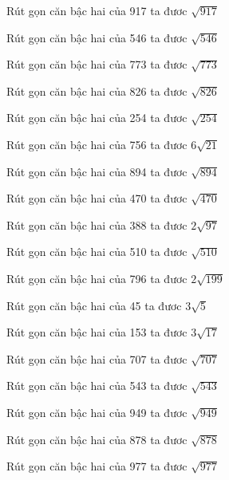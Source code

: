 \documentclass[12pt,a4paper]{article}
\begin{document}
\begin{ex}
Rút gọn căn bậc hai của 917 ta đươc $\sqrt{917}$
\end{ex}
\begin{ex}
Rút gọn căn bậc hai của 546 ta đươc $\sqrt{546}$
\end{ex}
\begin{ex}
Rút gọn căn bậc hai của 773 ta đươc $\sqrt{773}$
\end{ex}
\begin{ex}
Rút gọn căn bậc hai của 826 ta đươc $\sqrt{826}$
\end{ex}
\begin{ex}
Rút gọn căn bậc hai của 254 ta đươc $\sqrt{254}$
\end{ex}
\begin{ex}
Rút gọn căn bậc hai của 756 ta đươc $6\sqrt{21}$
\end{ex}
\begin{ex}
Rút gọn căn bậc hai của 894 ta đươc $\sqrt{894}$
\end{ex}
\begin{ex}
Rút gọn căn bậc hai của 470 ta đươc $\sqrt{470}$
\end{ex}
\begin{ex}
Rút gọn căn bậc hai của 388 ta đươc $2\sqrt{97}$
\end{ex}
\begin{ex}
Rút gọn căn bậc hai của 510 ta đươc $\sqrt{510}$
\end{ex}
\begin{ex}
Rút gọn căn bậc hai của 796 ta đươc $2\sqrt{199}$
\end{ex}
\begin{ex}
Rút gọn căn bậc hai của 45 ta đươc $3\sqrt{5}$
\end{ex}
\begin{ex}
Rút gọn căn bậc hai của 153 ta đươc $3\sqrt{17}$
\end{ex}
\begin{ex}
Rút gọn căn bậc hai của 707 ta đươc $\sqrt{707}$
\end{ex}
\begin{ex}
Rút gọn căn bậc hai của 543 ta đươc $\sqrt{543}$
\end{ex}
\begin{ex}
Rút gọn căn bậc hai của 949 ta đươc $\sqrt{949}$
\end{ex}
\begin{ex}
Rút gọn căn bậc hai của 878 ta đươc $\sqrt{878}$
\end{ex}
\begin{ex}
Rút gọn căn bậc hai của 977 ta đươc $\sqrt{977}$
\end{ex}
\end{document}
